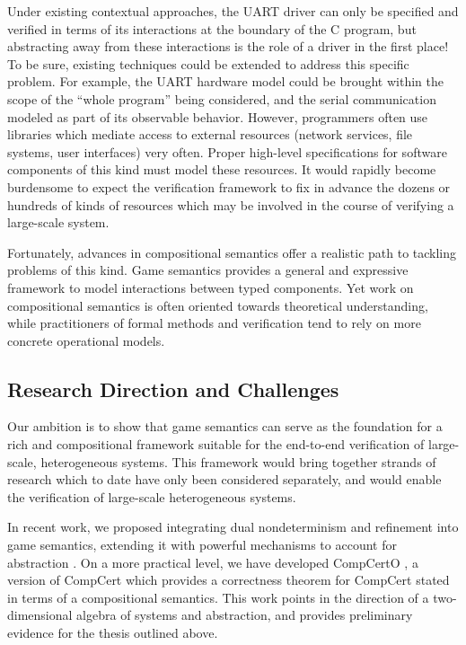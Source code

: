 Under existing contextual approaches, the UART driver can only be
specified and verified in terms of its interactions at the boundary of
the C program, but abstracting away from these interactions is
the role of a driver in the first place!
To be sure, existing techniques could be extended to address this
specific problem.  For example, the UART hardware model could be
brought within the scope of the ``whole program'' being considered,
and the serial communication modeled as part of its observable
behavior.
However,
programmers often use libraries which mediate access to
external resources (network services, file systems, user interfaces)
very often.
Proper high-level specifications for software components of this kind
must model these resources.  It would rapidly become burdensome to
expect the verification framework to fix in advance the dozens or
hundreds of kinds of resources which may be involved in the course of
verifying a large-scale system.

Fortunately, advances in compositional semantics offer a realistic
path to tackling problems of this kind.
Game semantics provides a general and expressive framework to
model interactions between typed components.
Yet work on compositional semantics
is often oriented towards theoretical understanding,
while practitioners of formal methods and verification
tend to rely on more concrete operational models.

\subsection{Research Direction and Challenges}

Our ambition is to show that %
game semantics
can serve as the foundation
for a rich and compositional framework
suitable for the end-to-end verification of
large-scale, heterogeneous systems.
This framework would
bring together strands of research
which to date have only been considered separately,
and would enable
the verification of large-scale heterogeneous systems.

In recent work, we proposed
integrating dual nondeterminism and refinement into game semantics,
extending it with powerful mechanisms to account for abstraction
\cite{koenig20,layered22}.
On a more practical level,
we have developed CompCertO \cite{compcerto},
a version of CompCert which
provides a correctness theorem for CompCert
stated in terms of a compositional semantics.
This work points in the direction of a two-dimensional algebra 
of systems and abstraction, and
provides preliminary evidence
for the thesis outlined above.

